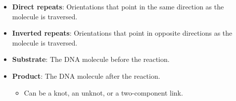 \documentclass[titlepage]{article}
\numberwithin{figure}{section}
\numberwithin{table}{section}
\numberwithin{equation}{section}
\begin{document}
\begin{itemize}
\begin{figure}[h!]
\begin{subfigure}[b]{0.2\linewidth}
            \caption{Inverted repeats.}
            \label{fig:directinvertedb}
        \end{subfigure}
        \caption{Recombination site orientations in a cyclic DNA molecule.}
        \label{fig:directinverted}
    \end{figure}
    \begin{itemize}
        \item The circular DNA is created such that it contains both recombination sites within it.
        \item Because these sites must have nonpalindromic base sequences, they can be oriented.
        \item Because of their orientation, the molecule can either have \textbf{direct repeats} or \textbf{inverted repeats} (see Figure \ref{fig:directinverted}).
        \item During the reaction, the two sites are lined up such that their orientations match.
    \end{itemize}
    \item \textbf{Direct repeats}: Orientations that point in the same direction as the molecule is traversed.
    \item \textbf{Inverted repeats}: Orientations that point in opposite directions as the molecule is traversed.
    \item \textbf{Substrate}: The DNA molecule before the reaction.
    \item \textbf{Product}: The DNA molecule after the reaction.
    \begin{itemize}
        \item Can be a knot, an unknot, or a two-component link.
    \end{itemize}
    \begin{figure}[h!]
        \centering
        \begin{subfigure}[b]{0.2\linewidth}
            \centering
\end{subfigure}
\end{figure}
\end{itemize}
\end{document}
